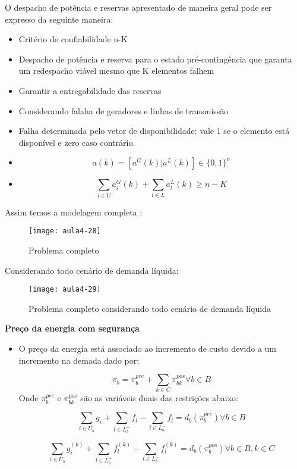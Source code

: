 {O despacho de potência e reservas apresentado de maneira geral pode ser expresso da seguinte maneira:
\begin{itemize}
\item Critério de confiabilidade n-K
\item Despacho de potência e reserva para o estado pré-contingência que garanta um redespacho viável mesmo que K elementos falhem
\item Garantir a entregabilidade das reservas
\item Considerando falaha de geradores e linhas de transmissão
\item Falha determinada pelo vetor de disponibilidade: vale 1 se o elemento está disponível e zero caso contrário.
\item $$a(k)=\left[a^{G}(k)|a^{L}(k)\right]\in\{0,1\}^{n}$$
\item $$\sum_{i\in U}a_{i}^{G}(k)+\sum_{l\in L}a_{l}^{L}(k)\geq n-K$$
\end{itemize}
Assim temos a modelagem completa :
\begin{figure}[H]
\begin{centering}
\texttt{[image: aula4-28]}\protect\caption{\label{fig:aula4-28} Problema completo}
\end{centering}
\end{figure}
Considerando todo cenário de demanda líquida:
\begin{figure}[H]
\begin{centering}
\texttt{[image: aula4-29]}\protect\caption{\label{fig:aula4-29} Problema completo considerando todo cenário de demanda líquida}
\end{centering}
\end{figure}

\textbf{Preço da energia com segurança}
\begin{itemize}
\item O preço da energia está associado ao incremento de custo devido a
um incremento na demada dado por:

\[
\pi_{b}=\pi_{b}^{pre}+\sum_{k\in C}\pi_{bk}^{pos}\forall b\in B
\]
Onde $\pi_{b}^{pre}$ e $\pi_{bk}^{pos}$ são as variáveis duais das
restrições abaixo:

\[
\sum_{i\in U_{b}}g_{i}+\sum_{l\in L_{b}^{+}}f_{l}-\sum_{l\in L_{b}^{-}}f_{l}=d_{b}(\pi_{b}^{pre})\forall b\in B
\]


\[
\sum_{i\in U_{b}}g_{i}^{(k)}+\sum_{l\in L_{b}^{+}}f_{l}^{(k)}-\sum_{l\in L_{b}^{-}}f_{l}^{(k)}=d_{b}(\pi_{b}^{pos})\forall b\in B,k\in C
\]


\end{itemize}}
